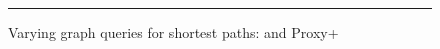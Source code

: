 \begin{figure}[t!]
\begin{center}
\end{center}
\vspace{1ex}
\caption{Varying graph queries for shortest paths: \ah and Proxy+\ah}
\label{fig:performance_path_queries_ah}
\hrule
\vspace{-1ex}
\end{figure}























